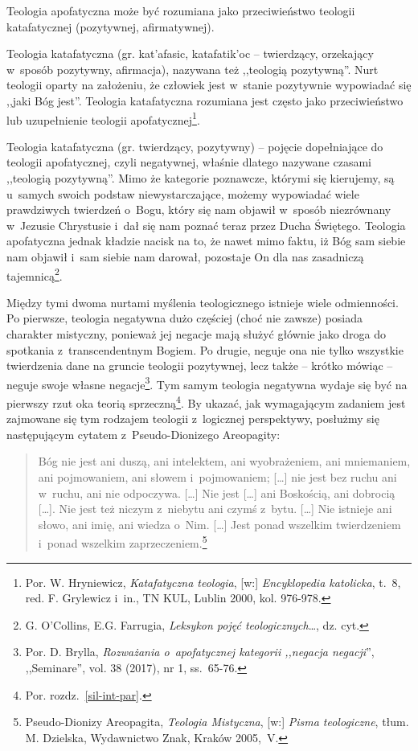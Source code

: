 Teologia apofatyczna może być rozumiana jako przeciwieństwo teologii katafatycznej (pozytywnej, afirmatywnej).


\begin{defin}
Teologia katafatyczna (gr. \textgreek{kat'afasic}, \textgreek{katafatik'oc}  -- twierdzący, orzekający w~sposób pozytywny, afirmacja), nazywana też ,,teologią pozytywną''. Nurt teologii oparty na założeniu, że człowiek jest w~stanie pozytywnie wypowiadać się ,,jaki Bóg jest''. Teologia katafatyczna rozumiana jest często jako przeciwieństwo lub uzupełnienie teologii apofatycznej\footnote{Por. W. Hryniewicz, \textit{Katafatyczna teologia}, [w:] \textit{Encyklopedia katolicka}, t.~8, red. F. Grylewicz i~in., TN KUL, Lublin 2000, kol. 976-978.}.
\end{defin}
\begin{defin}
Teologia katafatyczna (gr. twierdzący, pozytywny) -- pojęcie dopełniające do teologii apofatycznej, czyli negatywnej, właśnie dlatego nazywane czasami ,,teologią pozytywną''. Mimo że kategorie poznawcze, którymi się kierujemy, są u~samych swoich podstaw niewystarczające, możemy wypowiadać wiele prawdziwych twierdzeń o~Bogu, który się nam objawił w~sposób niezrównany w~Jezusie Chrystusie i~dał się nam poznać teraz przez Ducha Świętego. Teologia apofatyczna jednak kładzie nacisk na to, że nawet mimo faktu, iż Bóg sam siebie nam objawił i~sam siebie nam darował, pozostaje On dla nas zasadniczą tajemnicą\footnote{G. O'Collins, E.G. Farrugia, \textit{Leksykon pojęć teologicznych}\ldots, dz. cyt.}.
\end{defin}

Między tymi dwoma nurtami myślenia teologicznego istnieje wiele odmienności. Po pierwsze, teologia negatywna dużo częściej (choć nie zawsze) posiada charakter mistyczny, ponieważ jej negacje mają służyć głównie jako droga do spotkania z~transcendentnym Bogiem. Po drugie, neguje ona nie tylko wszystkie twierdzenia dane na gruncie teologii pozytywnej, lecz także -- krótko mówiąc -- neguje swoje własne negacje\footnote{Por. D. Brylla, \textit{Rozważania o~apofatycznej kategorii ,,negacja negacji}'', ,,Seminare'', vol. 38 (2017), nr 1, ss.~65-76.}. Tym samym teologia negatywna wydaje się być na pierwszy rzut oka teorią sprzeczną\footnote{Por. rozdz.~\ref{sil-int-par}.}. By ukazać, jak wymagającym zadaniem jest zajmowane się tym rodzajem teologii z~logicznej perspektywy, posłużmy się następującym cytatem z~Pseudo-Dionizego Areopagity:

\begin{quote}
Bóg nie jest ani duszą, ani intelektem, ani wyobrażeniem, ani mniemaniem, ani pojmowaniem, ani słowem i~pojmowaniem; [\ldots] nie jest bez ruchu ani w~ruchu, ani nie odpoczywa. [\ldots] Nie jest [\ldots] ani Boskością, ani dobrocią [\ldots]. Nie jest też niczym z~niebytu ani czymś z~bytu. [\ldots] Nie istnieje ani słowo, ani imię, ani wiedza o~Nim. [\ldots] Jest ponad wszelkim twierdzeniem i~ponad wszelkim zaprzeczeniem.\footnote{Pseudo-Dionizy Areopagita, \textit{Teologia Mistyczna}, [w:] \textit{Pisma teologiczne}, tłum. M. Dzielska, Wydawnictwo Znak, Kraków 2005,~V.}
\end{quote}

